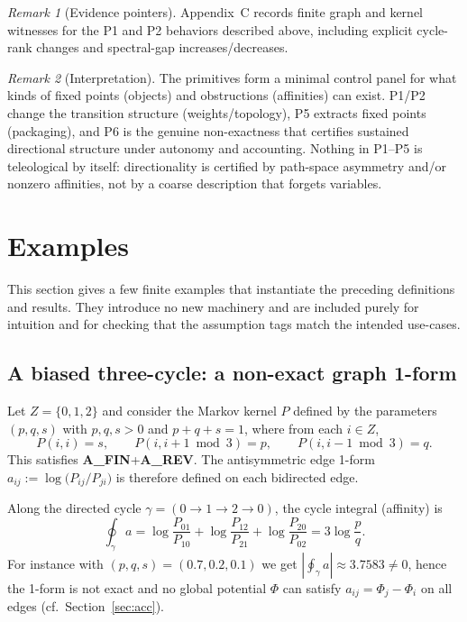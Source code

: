 \documentclass[11pt]{article}
\theoremstyle{remark}
\newtheorem{remark}{Remark}
\begin{document}
\begin{remark}[Evidence pointers]
Appendix~C records finite graph and kernel witnesses for the P1 and P2 behaviors described above,
including explicit cycle-rank changes and spectral-gap increases/decreases.
\end{remark}

\begin{remark}[Interpretation]
The primitives form a minimal control panel for what kinds of fixed points (objects) and obstructions (affinities) can exist.
P1/P2 change the transition structure (weights/topology), P5 extracts fixed points (packaging), and P6 is the genuine non-exactness that certifies sustained directional structure under autonomy and accounting.
Nothing in P1--P5 is teleological by itself: directionality is certified by path-space asymmetry and/or nonzero affinities, not by a coarse description that forgets variables.
\end{remark}

\section{Examples}
\label{sec:examples}

This section gives a few finite examples that instantiate the preceding definitions and results.
They introduce no new machinery and are included purely for intuition and for checking that the
assumption tags match the intended use-cases.

\subsection{A biased three-cycle: a non-exact graph 1-form}
\label{subsec:ex:3cycle}

Let $Z=\{0,1,2\}$ and consider the Markov kernel $P$ defined by the parameters $(p,q,s)$ with
$p,q,s>0$ and $p+q+s=1$, where from each $i\in Z$,
\[
P(i,i)=s,\qquad P(i,i+1\bmod 3)=p,\qquad P(i,i-1\bmod 3)=q.
\]
This satisfies \textbf{A\_FIN}+\textbf{A\_REV}. The antisymmetric edge 1-form
$a_{ij}:=\log\!\big(P_{ij}/P_{ji}\big)$ is therefore defined on each bidirected edge.

Along the directed cycle $\gamma=(0\to 1\to 2\to 0)$, the cycle integral (affinity) is
\[
\oint_{\gamma} a
= \log\frac{P_{01}}{P_{10}}+\log\frac{P_{12}}{P_{21}}+\log\frac{P_{20}}{P_{02}}
= 3\log\frac{p}{q}.
\]
For instance with $(p,q,s)=(0.7,0.2,0.1)$ we get $|\oint_\gamma a|\approx 3.7583\neq 0$, hence the 1-form
is not exact and no global potential $\Phi$ can satisfy $a_{ij}=\Phi_j-\Phi_i$ on all edges (cf.\ Section~\ref{sec:acc}).
\end{document}
